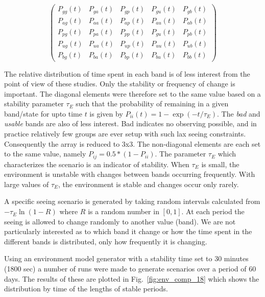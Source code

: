 \begin{equation}
 \left( 
\begin{array}{ccccc}
  P_{gg}(t) & P_{ga}(t) & P_{gp}(t) & P_{gu}(t) & P_{gb}(t)\\
  P_{ag}(t) & P_{aa}(t) & P_{ap}(t) & P_{au}(t) & P_{ab}(t)\\
  P_{pg}(t) & P_{pa}(t) & P_{pp}(t) & P_{gu}(t) & P_{pb}(t)\\
  P_{ug}(t) & P_{ua}(t) & P_{up}(t) & P_{uu}(t) & P_{ub}(t)\\
  P_{bg}(t) & P_{ba}(t) & P_{bp}(t) & P_{bu}(t) & P_{bb}(t)

\end{array} 
\right)
\end{equation}

 The relative distribution of time spent in each band is of less interest from the point of view of these studies. Only the stability or frequency of change is important.  The diagonal elements were therefore set to the same value based on a stability parameter $\tau_E$ such that the probability of remaining in a given band/state for upto time $t$ is given by $P_{ii}(t) = 1 - \exp{(-t/\tau_E)}$. The \emph{bad} and \emph{usable} bands are also of less interest. Bad indicates no observing possible, and in practice relatively few groups are ever setup with such lax seeing constraints. Consequently the array is reduced to 3x3. The non-diagonal elements are each set to the same value, namely $P_{ij} = 0.5*(1 - P_{ii})$. The parameter $\tau_E$ which characterizes the scenario is an indicator of stability. When $\tau_E$ is small, the environment is unstable with changes between bands occurring frequently. With large values of $\tau_E$, the environment is stable and changes occur only rarely.

A specific seeing scenario is generated by taking random intervals calculated from $-\tau_E \ln{(1-R)}$ where $R$ is a random number in $[0,1]$. At each period the seeing is allowed to change randomly to another value (band). We are not particularly interested as to which band it change or how the time spent in the different bands is distributed, only how frequently it is changing. 

Using an environment model generator with a stability time set to 30 minutes (1800 sec) a number of runs were made to generate scenarios over a period of 60 days. The results of these are plotted in Fig.~\ref{fig:env_comp_18} which shows the distribution by time of the lengths of stable periods. 

